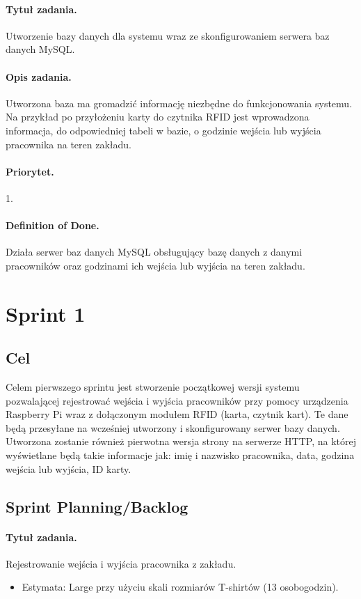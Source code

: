 \documentclass[a4paper]{article}
\begin{document}
\paragraph{Tytuł zadania.} Utworzenie bazy danych dla systemu wraz ze skonfigurowaniem serwera baz danych MySQL.
\paragraph{Opis zadania.} Utworzona baza ma gromadzić informację niezbędne do funkcjonowania systemu. Na przykład po przyłożeniu karty do czytnika RFID jest wprowadzona informacja, do odpowiedniej tabeli w bazie, o godzinie wejścia lub wyjścia pracownika na teren zakładu. 
\paragraph{Priorytet.} 1.
\paragraph{Definition of Done.} Działa serwer baz danych MySQL obsługujący bazę danych z danymi pracowników oraz godzinami ich wejścia lub wyjścia na teren zakładu. 

\section{Sprint 1}
\subsection{Cel} Celem pierwszego sprintu jest stworzenie początkowej wersji systemu pozwalającej rejestrować wejścia i wyjścia pracowników przy pomocy urządzenia Raspberry Pi wraz z dołączonym modułem RFID (karta, czytnik kart). Te dane będą przesyłane na wcześniej utworzony i skonfigurowany serwer bazy danych. Utworzona zostanie również pierwotna wersja strony na serwerze HTTP, na której wyświetlane będą takie informacje jak: imię i nazwisko pracownika, data, godzina wejścia lub wyjścia, ID karty.

\subsection{Sprint Planning/Backlog}

\paragraph{Tytuł zadania.} Rejestrowanie wejścia i wyjścia pracownika z zakładu.
\begin{itemize}
\item Estymata: Large przy użyciu skali rozmiarów T-shirtów (13 osobogodzin).
\end{itemize}
\end{document}
